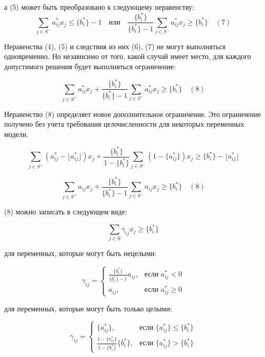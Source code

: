 \documentclass[17pt]{extarticle}
\begin{document}
а (5) может быть преобразовано к следующему неравенству:
\[
    \sum_{j \in S^-} a_{ij}^* x_j \leq \{b_i^*\} - 1 \quad \text{или} \quad \frac{\{b_i^*\}}{\{b_i^*\} - 1} \sum_{j \in S^-} a_{ij}^* x_j \geq \{b_i^*\} \quad (7)
\]

Неравенства (4), (5) и следствия из них (6), (7) не могут выполняться одновременно. Но независимо от того, какой случай имеет место, для каждого допустимого решения будет выполняться ограничение:

\[
    \sum_{j \in S^+} a_{ij}^* x_j + \frac{\{b_i^*\}}{\{b_i^*\} - 1} \sum_{j \in S^-} a_{ij}^* x_j \geq \{b_i^*\} \quad (8)
\]

Неравенство (8) определяет новое дополнительное ограничение.
Это ограничение получено без учета требования целочисленности для некоторых переменных модели.

\[
    \sum_{j \in S^+} (a_{ij}^* - \lfloor a_{ij}^* \rfloor) x_j + \frac{\{b_i^*\}}{1 - \{b_i^*\}} \sum_{j \in S^-} (1 - \{a_{ij}^*\}) x_j
    \geq
    \{b_i^*\} - \lfloor a_{ij}^* \rfloor
\]

\[
    \sum_{j \in S^+} a_{ij}x_j + \frac{\{b_i^*\}}{\{b_i^*\} - 1} \sum_{j \in S^-} a_{ij}x_j \geq \{b_i^*\} \quad (8)
\]

(8) можно записать в следующем виде:

\[
    \sum_{j \in S} \gamma_{ij}x_j \geq \{b_i^*\}
\]

для переменных, которые могут быть нецелыми:

\[
    \gamma_{ij} =
    \begin{cases}
        \frac{\{b_i^*\}}{\{b_i^*\} - 1} a_{ij}, & \text{если } a_{ij}^* < 0    \\
        a_{ij},                                 & \text{если } a_{ij}^* \geq 0
    \end{cases}
\]

для переменных, которые могут быть только целыми:

\[
    \gamma_{ij} =
    \begin{cases}
        \{a_{ij}^*\},                                     & \text{если } \{a_{ij}^*\} \leq \{b_i^*\} \\
        \frac{1 - \{a_{ij}^*\}}{1 - \{b_i^*\}} \{b_i^*\}, & \text{если } \{a_{ij}^*\} > \{b_i^*\}
    \end{cases}
\]
\end{document}
